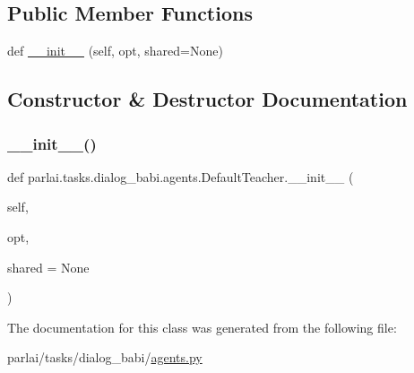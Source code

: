 \subsection*{Public Member Functions}
\begin{DoxyCompactItemize}
\item 
def \hyperlink{classparlai_1_1tasks_1_1dialog__babi_1_1agents_1_1DefaultTeacher_a973ffa6cd8da99b24a2009f79c4431c4}{\+\_\+\+\_\+init\+\_\+\+\_\+} (self, opt, shared=None)
\end{DoxyCompactItemize}


\subsection{Constructor \& Destructor Documentation}
\mbox{\label{classparlai_1_1tasks_1_1dialog__babi_1_1agents_1_1DefaultTeacher_a973ffa6cd8da99b24a2009f79c4431c4}} 
\subsubsection{\texorpdfstring{\+\_\+\+\_\+init\+\_\+\+\_\+()}{\_\_init\_\_()}}
{\footnotesize\ttfamily def parlai.\+tasks.\+dialog\+\_\+babi.\+agents.\+Default\+Teacher.\+\_\+\+\_\+init\+\_\+\+\_\+ (\begin{DoxyParamCaption}\item[{}]{self,  }\item[{}]{opt,  }\item[{}]{shared = {\ttfamily None} }\end{DoxyParamCaption})}



The documentation for this class was generated from the following file\+:\begin{DoxyCompactItemize}
\item 
parlai/tasks/dialog\+\_\+babi/\hyperlink{parlai_2tasks_2dialog__babi_2agents_8py}{agents.\+py}\end{DoxyCompactItemize}
